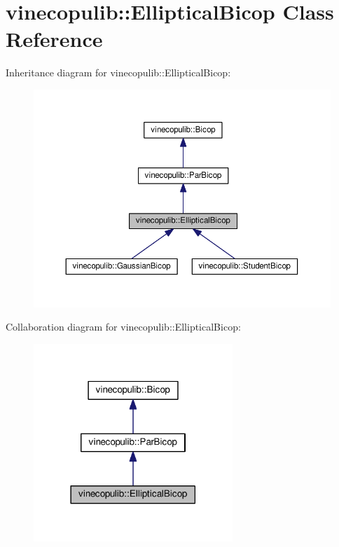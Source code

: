 \hypertarget{classvinecopulib_1_1_elliptical_bicop}{}\section{vinecopulib\+:\+:Elliptical\+Bicop Class Reference}
\label{classvinecopulib_1_1_elliptical_bicop}


Inheritance diagram for vinecopulib\+:\+:Elliptical\+Bicop\+:\nopagebreak
\begin{figure}[H]
\begin{center}
\leavevmode
\includegraphics[width=350pt]{classvinecopulib_1_1_elliptical_bicop__inherit__graph}
\end{center}
\end{figure}


Collaboration diagram for vinecopulib\+:\+:Elliptical\+Bicop\+:\nopagebreak
\begin{figure}[H]
\begin{center}
\leavevmode
\includegraphics[width=213pt]{classvinecopulib_1_1_elliptical_bicop__coll__graph}
\end{center}
\end{figure}
